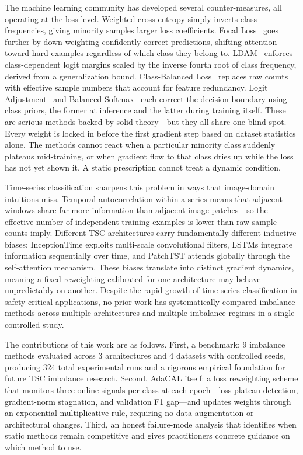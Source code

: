 \documentclass[letterpaper]{article}
\begin{document}
The machine learning community has developed several counter-measures, all operating at the loss level. Weighted cross-entropy simply inverts class frequencies, giving minority samples larger loss coefficients. Focal Loss~\citep{lin2017focal} goes further by down-weighting confidently correct predictions, shifting attention toward hard examples regardless of which class they belong to. LDAM~\citep{cao2019ldam} enforces class-dependent logit margins scaled by the inverse fourth root of class frequency, derived from a generalization bound. Class-Balanced Loss~\citep{cui2019class} replaces raw counts with effective sample numbers that account for feature redundancy. Logit Adjustment~\citep{menon2021logit} and Balanced Softmax~\citep{ren2020balanced} each correct the decision boundary using class priors, the former at inference and the latter during training itself. These are serious methods backed by solid theory---but they all share one blind spot. Every weight is locked in before the first gradient step based on dataset statistics alone. The methods cannot react when a particular minority class suddenly plateaus mid-training, or when gradient flow to that class dries up while the loss has not yet shown it. A static prescription cannot treat a dynamic condition.

Time-series classification sharpens this problem in ways that image-domain intuitions miss. Temporal autocorrelation within a series means that adjacent windows share far more information than adjacent image patches---so the effective number of independent training examples is lower than raw sample counts imply. Different TSC architectures carry fundamentally different inductive biases: InceptionTime exploits multi-scale convolutional filters, LSTMs integrate information sequentially over time, and PatchTST attends globally through the self-attention mechanism. These biases translate into distinct gradient dynamics, meaning a fixed reweighting calibrated for one architecture may behave unpredictably on another. Despite the rapid growth of time-series classification in safety-critical applications, no prior work has systematically compared imbalance methods across multiple architectures and multiple imbalance regimes in a single controlled study.

The contributions of this work are as follows. First, a benchmark: 9 imbalance methods evaluated across 3 architectures and 4 datasets with controlled seeds, producing 324 total experimental runs and a rigorous empirical foundation for future TSC imbalance research. Second, AdaCAL itself: a loss reweighting scheme that monitors three online signals per class at each epoch---loss-plateau detection, gradient-norm stagnation, and validation F1 gap---and updates weights through an exponential multiplicative rule, requiring no data augmentation or architectural changes. Third, an honest failure-mode analysis that identifies when static methods remain competitive and gives practitioners concrete guidance on which method to use.
\end{document}
